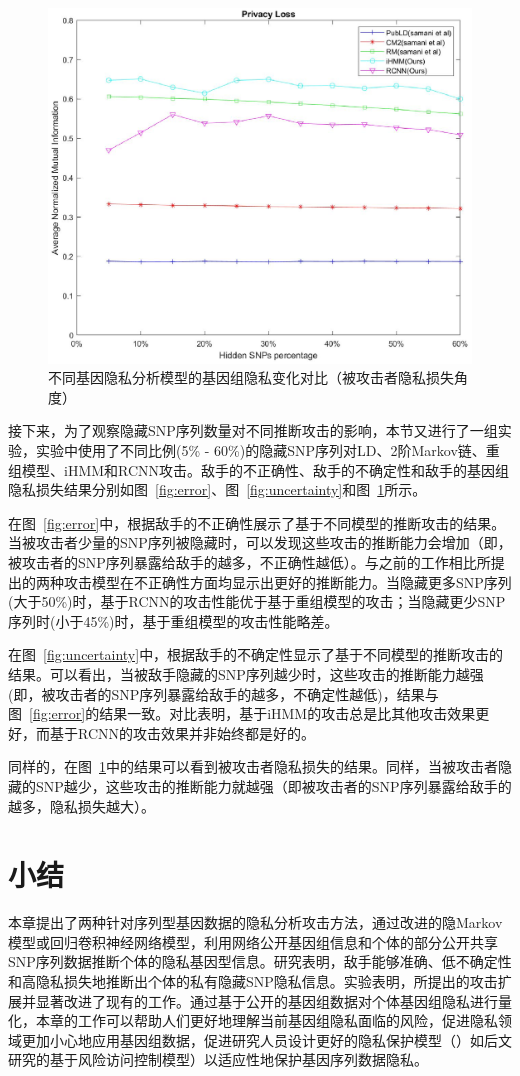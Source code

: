 \begin{figure}[htbp]
	\centering
	\includegraphics[width =0.8\linewidth]{./figures/Fig7-genomic-privacy-quantifying-privacyloss.eps}
	\caption{不同基因隐私分析模型的基因组隐私变化对比（被攻击者隐私损失角度）}
	\label{fig:privacyloss}
\end{figure}

接下来，为了观察隐藏SNP序列数量对不同推断攻击的影响，本节又进行了一组实验，实验中使用了不同比例(5\% - 60\%)的隐藏SNP序列对LD、2阶Markov链、重组模型、iHMM和RCNN攻击。敌手的不正确性、敌手的不确定性和敌手的基因组隐私损失结果分别如图~\ref{fig:error}、图~\ref{fig:uncertainty}和图~\ref{fig:privacyloss}所示。

在图~\ref{fig:error}中，根据敌手的不正确性展示了基于不同模型的推断攻击的结果。当被攻击者少量的SNP序列被隐藏时，可以发现这些攻击的推断能力会增加（即，被攻击者的SNP序列暴露给敌手的越多，不正确性越低）。与之前的工作相比所提出的两种攻击模型在不正确性方面均显示出更好的推断能力。当隐藏更多SNP序列(大于50\%)时，基于RCNN的攻击性能优于基于重组模型的攻击；当隐藏更少SNP序列时(小于45\%)时，基于重组模型的攻击性能略差。

在图~\ref{fig:uncertainty}中，根据敌手的不确定性显示了基于不同模型的推断攻击的结果。可以看出，当被敌手隐藏的SNP序列越少时，这些攻击的推断能力越强(即，被攻击者的SNP序列暴露给敌手的越多，不确定性越低)，结果与图~\ref{fig:error}的结果一致。对比表明，基于iHMM的攻击总是比其他攻击效果更好，而基于RCNN的攻击效果并非始终都是好的。

同样的，在图~\ref{fig:privacyloss}中的结果可以看到被攻击者隐私损失的结果。同样，当被攻击者隐藏的SNP越少，这些攻击的推断能力就越强（即被攻击者的SNP序列暴露给敌手的越多，隐私损失越大）。

\section{小结}\label{sec:concl}

本章提出了两种针对序列型基因数据的隐私分析攻击方法，通过改进的隐Markov模型或回归卷积神经网络模型，利用网络公开基因组信息和个体的部分公开共享SNP序列数据推断个体的隐私基因型信息。研究表明，敌手能够准确、低不确定性和高隐私损失地推断出个体的私有隐藏SNP隐私信息。实验表明，所提出的攻击扩展并显著改进了现有的工作。通过基于公开的基因组数据对个体基因组隐私进行量化，本章的工作可以帮助人们更好地理解当前基因组隐私面临的风险，促进隐私领域更加小心地应用基因组数据，促进研究人员设计更好的隐私保护模型（）如后文研究的基于风险访问控制模型）以适应性地保护基因序列数据隐私。


